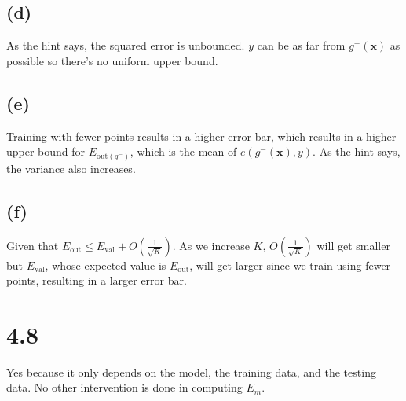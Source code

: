 \documentclass{article}
\begin{document}
	\subsection*{(d)}
		As the hint says, the squared error is unbounded. $y$ can be as far from $g^-(\mathbf x)$ as possible so there's no uniform upper bound.
	\subsection*{(e)}
		Training with fewer points results in a higher error bar, which results in a higher upper bound for $E_{\text{out}(g^-)}$, which is the mean of $e(g^-(\mathbf x), y)$. As the hint says, the variance also increases.
	\subsection*{(f)}
		Given that $E_\text{out} \leq E_\text{val} + O(\frac1{\sqrt K})$. As we increase $K$, $O(\frac1{\sqrt K})$ will get smaller but $E_\text{val}$, whose expected value is $E_\text{out}$, will get larger since we train using fewer points, resulting in a larger error bar.
	\section*{4.8}
		Yes because it only depends on the model, the training data, and the testing data. No other intervention is done in computing $E_m$.
\end{document}
